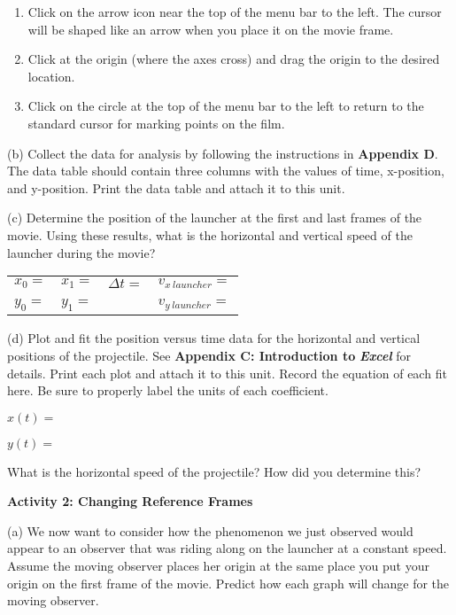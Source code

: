 \begin{enumerate}
\item Click on the arrow icon near the top of the menu bar to the left.
The cursor will be shaped like an arrow when you place it on the movie
frame.
\item Click at the origin (where the axes cross) and drag the origin to
the desired location.
\item Click on the circle at the top of the menu bar to the left to return
to the standard cursor for marking points on the film.
\end{enumerate}
(b) Collect the data for analysis by following the instructions in
\textbf{Appendix D}. The data table should contain three columns with
the values of time, x-position, and y-position. Print the data table
and attach it to this unit.

(c) Determine the position of the launcher at the first and last frames
of the movie. Using these results, what is the horizontal and vertical
speed of the launcher during the movie?

\vspace{0.3cm}
{\centering \begin{tabular}{p{20mm}p{20mm}p{30mm}p{70mm}}
\( x_{0}= \) &
\( x_{1}= \)&
\( \Delta t= \)&
\( v_{x\ launcher}= \) \\
&
&
&
\\
\( y_{0}= \)&
\( y_{1}= \) &
&
\( v_{y\ launcher} =\) \\
\end{tabular}\par}
\vspace{0.3cm}

(d) Plot and fit the position versus time data for the horizontal
and vertical positions of the projectile. See \textbf{Appendix C:
Introduction to} \textbf{\emph{Excel}} for details. Print each
plot and attach it to this unit. Record the equation of each fit here.
Be sure to properly label the units of each coefficient.

$x(t) =$
\vspace*{5mm}

$y(t) =$
\vspace{5mm}

What is the horizontal speed of the projectile? How did you determine
this?
\vspace{2in}

\textbf{Activity 2: Changing Reference Frames}

(a) We now want to consider how the phenomenon we just observed would
appear to an observer that was riding along on the launcher at a constant
speed. Assume the moving observer places her origin at the same place
you put your origin on the first frame of the movie. Predict how each
graph will change for the moving observer.

